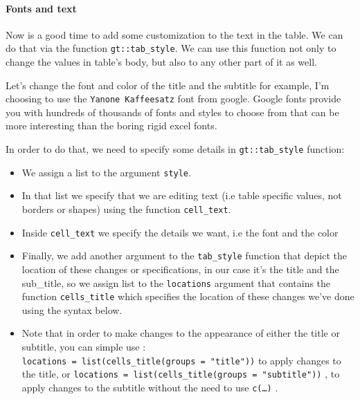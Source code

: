 \documentclass[
]{article}
\begin{document}
\hypertarget{fonts-and-text}{%
\paragraph{Fonts and text}\label{fonts-and-text}}

Now is a good time to add some customization to the text in the table.
We can do that via the function \texttt{gt::tab\_style}. We can use this
function not only to change the values in table's body, but also to any
other part of it as well.

Let's change the font and color of the title and the subtitle for
example, I'm choosing to use the \texttt{Yanone\ Kaffeesatz} font from
google. Google fonts provide you with hundreds of thousands of fonts and
styles to choose from that can be more interesting than the boring rigid
excel fonts.

In order to do that, we need to specify some details in
\texttt{gt::tab\_style} function:

\begin{itemize}
\item
  We assign a list to the argument \texttt{style}.
\item
  In that list we specify that we are editing text (i.e table specific
  values, not borders or shapes) using the function \texttt{cell\_text}.
\item
  Inside \texttt{cell\_text} we specify the details we want, i.e the
  font and the color
\item
  Finally, we add another argument to the \texttt{tab\_style} function
  that depict the location of these changes or specifications, in our
  case it's the title and the sub\_title, so we assign list to the
  \texttt{locations} argument that contains the function
  \texttt{cells\_title} which specifies the location of these changes
  we've done using the syntax below.
\item
  Note that in order to make changes to the appearance of either the
  title or subtitle, you can simple use :
  \texttt{locations\ =\ list(cells\_title(groups\ =\ "title"))} to apply
  changes to the title, or
  \texttt{locations\ =\ list(cells\_title(groups\ =\ "subtitle"))} , to
  apply changes to the subtitle without the need to use \texttt{c(…)} .
\end{itemize}
\end{document}
